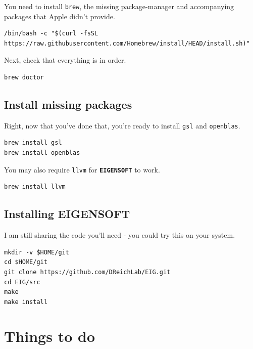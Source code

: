 \documentclass[
]{book}
\newcommand{\passthrough}[1]{#1}
\begin{document}
You need to install \passthrough{\lstinline!brew!}, the missing package-manager and accompanying packages that Apple didn't provide.

\begin{lstlisting}
/bin/bash -c "$(curl -fsSL https://raw.githubusercontent.com/Homebrew/install/HEAD/install.sh)"
\end{lstlisting}

Next, check that everything is in order.

\begin{lstlisting}
brew doctor
\end{lstlisting}

\hypertarget{install-missing-packages}{%
\section{Install missing packages}\label{install-missing-packages}}

Right, now that you've done that, you're ready to install \passthrough{\lstinline!gsl!} and \passthrough{\lstinline!openblas!}.

\begin{lstlisting}
brew install gsl
brew install openblas
\end{lstlisting}

You may also require \passthrough{\lstinline!llvm!} for \textbf{\passthrough{\lstinline!EIGENSOFT!}} to work.

\begin{lstlisting}
brew install llvm
\end{lstlisting}

\hypertarget{installing-eigensoft}{%
\section{Installing EIGENSOFT}\label{installing-eigensoft}}

I am still sharing the code you'll need - you could try this on your system.

\begin{lstlisting}
mkdir -v $HOME/git
cd $HOME/git
git clone https://github.com/DReichLab/EIG.git
cd EIG/src
make
make install
\end{lstlisting}

\hypertarget{todo}{%
\chapter{Things to do}\label{todo}}
\end{document}

